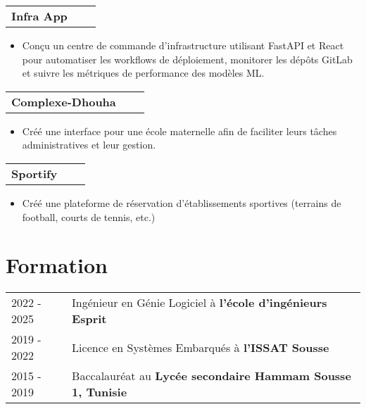 \documentclass[a4paper,11pt]{article}
\makeatletter
\newenvironment{jobshort}[2]
    {
    \begin{tabularx}{\linewidth}{@{}l X r@{}}
    \textbf{#1} & \hfill &  #2 \\[2.75pt]
    \end{tabularx}
    \begin{minipage}[t]{\linewidth}
    \begin{itemize}[nosep,after=\strut, leftmargin=1em, itemsep=2pt]
    }
    {
    \end{itemize}
    \end{minipage}
    }
\makeatother
\begin{document}
\begin{jobshort}{Infra App}{}
\item Conçu un centre de commande d'infrastructure utilisant FastAPI et React pour automatiser les workflows de déploiement, monitorer les dépôts GitLab et suivre les métriques de performance des modèles ML.
\end{jobshort}
\vspace{-1pt}
\begin{jobshort}{Complexe-Dhouha}{}
\item Créé une interface pour une école maternelle afin de faciliter leurs tâches administratives et leur gestion.
\end{jobshort}
\vspace{-1pt}
\begin{jobshort}{Sportify}{}
\item Créé une plateforme de réservation d'établissements sportives (terrains de football, courts de tennis, etc.)
\end{jobshort}

\vspace{-8pt}
\section{Formation}
\begin{tabularx}{\linewidth}{@{}l X@{}}	
2022 - 2025 & Ingénieur en Génie Logiciel à \textbf{l'école d'ingénieurs Esprit} \\

2019 - 2022 & Licence en Systèmes Embarqués à \textbf{l'ISSAT Sousse} \\ 

2015 - 2019 & Baccalauréat au \textbf{Lycée secondaire Hammam Sousse 1, Tunisie} \\
\end{tabularx}

\end{document}
